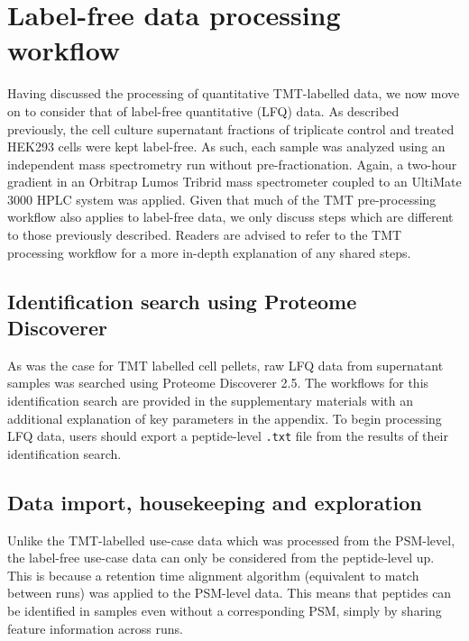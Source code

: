 \documentclass[9pt,a4paper,]{extarticle}
\begin{document}
\section{Label-free data processing workflow}\label{label-free-data-processing-workflow}

Having discussed the processing of quantitative TMT-labelled data, we now move
on to consider that of label-free quantitative (LFQ) data. As described
previously, the cell culture supernatant fractions of triplicate control and
treated HEK293 cells were kept label-free. As such, each sample was analyzed using
an independent mass spectrometry run without pre-fractionation. Again, a two-hour
gradient in an Orbitrap Lumos Tribrid mass spectrometer coupled to an UltiMate
3000 HPLC system was applied. Given that much of the TMT pre-processing workflow
also applies to label-free data, we only discuss steps which are different to
those previously described. Readers are advised to refer to the TMT processing
workflow for a more in-depth explanation of any shared steps.

\subsection{Identification search using Proteome Discoverer}\label{identification-search-using-proteome-discoverer}

As was the case for TMT labelled cell pellets, raw LFQ data from supernatant
samples was searched using Proteome Discoverer 2.5. The workflows for this
identification search are provided in the supplementary materials with an
additional explanation of key parameters in the appendix. To begin processing
LFQ data, users should export a peptide-level \texttt{.txt} file from the results of
their identification search.

\subsection{Data import, housekeeping and exploration}\label{data-import-housekeeping-and-exploration-1}

Unlike the TMT-labelled use-case data which was processed from the PSM-level, the
label-free use-case data can only be considered from the peptide-level up. This
is because a retention time alignment algorithm (equivalent to match between runs)
was applied to the PSM-level data. This means that peptides can be identified in
samples even without a corresponding PSM, simply by sharing feature information
across runs.
\end{document}
